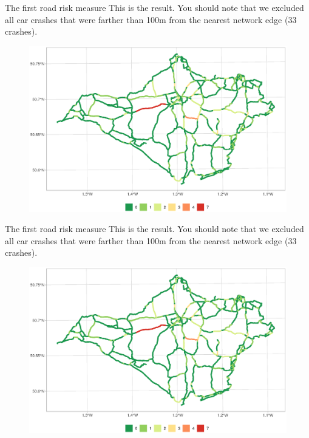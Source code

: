 \documentclass[c,10pt,pdftex]{beamer}
\begin{document}
\begin{frame}{The first road risk measure}
\vspace{-0.25cm}
This is the result. You should note that we excluded all car crashes that were farther than 100m from the nearest network edge (33  crashes). 
\begin{figure}
	\centering
	\includegraphics[width=\linewidth]{images/count_on_nearest_street}
\end{figure}
\end{frame}

\begin{frame}{The first road risk measure}
\vspace{-0.25cm}
This is the result. You should note that we excluded all car crashes that were farther than 100m from the nearest network edge (33  crashes). 
\begin{figure}
	\centering
	\includegraphics[width=\linewidth]{images/count_on_nearest_street}
\end{figure}
\end{frame}
\end{document}
